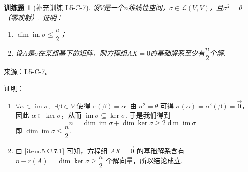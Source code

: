 \documentclass[UTF8,12pt,a4paper,fontset=fandol]{ctexart}
\newtheorem{exercise}{训练题}[section]
\begin{document}
\begin{exercise}[补充训练 L5-C-7]\label{prob:L5-C-7}
设$V$是一个$n$维线性空间，$\sigma\in \mathcal{L}(V,V)$，且$\sigma^2=\theta$（零映射）. 证明：
        \begin{enumerate}
            \item $ \dim \operatorname{im} \sigma \leqslant \dfrac{n}{2} $；

            \item 设$A$是$\sigma$在某组基下的矩阵，则方程组$AX=0$的基础解系至少有$\dfrac{n}{2}$个解.
        \end{enumerate}
\end{exercise}
\noindent 来源：\href{https://github.com/yhwu-is/Linear-Algebra-Left-Undone/blob/new/%E8%AE%B2%E4%B9%89/%E4%B8%93%E9%A2%98/5%20%E7%BA%BF%E6%80%A7%E6%98%A0%E5%B0%84.tex}{L5-C-7}。
\begin{solve}
证明：\begin{enumerate}
                \item \label{item:5:C:7:1}
                      $ \forall \alpha \in \operatorname{im} \sigma,\enspace \exists \beta \in V $ 使得 $ \sigma(\beta) = \alpha $. 由 $ \sigma^2 = \theta $ 可得 $ \sigma(\alpha) = \sigma^2(\beta) = \vec{0} $，因此 $ \alpha \in \ker \sigma $，从而 $ \operatorname{im} \sigma \subseteq \ker \sigma $. 于是我们得到
                      \[ n = \dim \operatorname{im} \sigma + \dim \ker \sigma \geqslant 2 \dim \operatorname{im} \sigma \]
                      即 $ \dim \operatorname{im} \sigma \leqslant \dfrac{n}{2} $.

                \item 由 \eqref{item:5:C:7:1} 可知，方程组 $ AX = \vec{0} $ 的基础解系含有 $ n - r(A) = \dim \ker \sigma \geqslant \dfrac{n}{2} $ 个解向量，所以结论成立.
            \end{enumerate}
\end{solve}
\end{document}

